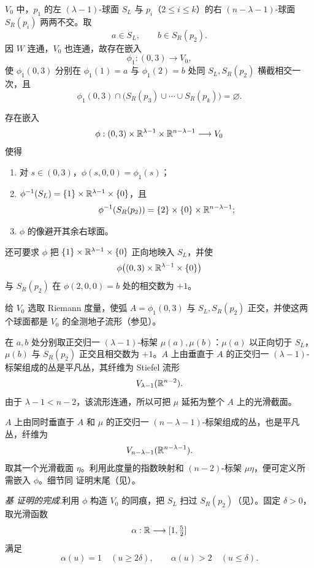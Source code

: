 $V_0$ 中，$p_1$ 的左 $(\lambda-1)$-球面 $S_L$ 与 $p_i$（$2\leq i\leq k$）的右 $(n-\lambda-1)$-球面 $S_R(p_i)$ 两两不交。取
\[
  a\in S_L,\qquad b\in S_R(p_2).
\]
因 $W$ 连通，$V_0$ 也连通，故存在嵌入
\[
  \phi_1:(0,3)\longrightarrow V_0,
\]
使 $\phi_1(0,3)$ 分别在 $\phi_1(1)=a$ 与 $\phi_1(2)=b$ 处同 $S_L,S_R(p_2)$ 横截相交一次，且
\[
  \phi_1(0,3)\cap
  \bigl(S_R(p_3)\cup\cdots\cup S_R(p_k)\bigr)=\varnothing.
\]

存在嵌入
\[
  \phi:(0,3)\times\mathbb{R}^{\lambda-1}\times\mathbb{R}^{n-\lambda-1}
  \longrightarrow V_0
\]
使得
\begin{enumerate}[label=(\arabic*)]
  \item 对 $s\in(0,3)$，$\phi(s,0,0)=\phi_1(s)$；
  \item $\phi^{-1}(S_L)=\{1\}\times\mathbb{R}^{\lambda-1}\times\{0\}$，且
  \[
    \phi^{-1}(S_R(p_2))
    =\{2\}\times\{0\}\times\mathbb{R}^{n-\lambda-1};
  \]
  \item $\phi$ 的像避开其余右球面。
\end{enumerate}
还可要求 $\phi$ 把 $\{1\}\times\mathbb{R}^{\lambda-1}\times\{0\}$ 正向地映入 $S_L$，并使
\[
  \phi\bigl((0,3)\times\mathbb{R}^{\lambda-1}\times\{0\}\bigr)
\]
与 $S_R(p_2)$ 在 $\phi(2,0,0)=b$ 处的相交数为 $+1$。

\Proof 给 $V_0$ 选取 Riemann 度量，使弧 $A=\phi_1(0,3)$ 与 $S_L,S_R(p_2)$ 正交，并使这两个球面都是 $V_0$ 的全测地子流形（参见）。

在 $a,b$ 处分别取正交归一 $(\lambda-1)$-标架 $\mu(a),\mu(b)$：$\mu(a)$ 以正向切于 $S_L$，$\mu(b)$ 与 $S_R(p_2)$ 正交且相交数为 $+1$。$A$ 上由垂直于 $A$ 的正交归一 $(\lambda-1)$-标架组成的丛是平凡丛，其纤维为 Stiefel 流形
\[
  V_{\lambda-1}(\mathbb{R}^{n-2}).
\]
由于 $\lambda-1<n-2$，该流形连通，所以可把 $\mu$ 延拓为整个 $A$ 上的光滑截面。

$A$ 上由同时垂直于 $A$ 和 $\mu$ 的正交归一 $(n-\lambda-1)$-标架组成的丛，也是平凡丛，纤维为
\[
  V_{n-\lambda-1}(\mathbb{R}^{n-\lambda-1}).
\]
取其一个光滑截面 $\eta$。利用此度量的指数映射和 $(n-2)$-标架 $\mu\eta$，便可定义所需嵌入 $\phi$。细节同 证明末尾（见）。
\EndProof

\par\medskip\noindent\textit{基 证明的完成.}\quad 利用 $\phi$ 构造 $V_0$ 的同痕，把 $S_L$ 扫过 $S_R(p_2)$（见）。固定 $\delta>0$，取光滑函数
\[
  \alpha:\mathbb{R}\longrightarrow[1,\tfrac52]
\]
满足
\[
  \alpha(u)=1\quad(u\geq2\delta),
  \qquad
  \alpha(u)>2\quad(u\leq\delta).
\]


